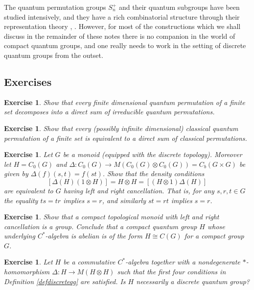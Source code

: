 \documentclass[a4paper]{amsart}
\numberwithin{equation}{section}
\theoremstyle{change}
\newtheorem{exercise}[theorem]{Exercise}
\begin{document}
The quantum permutation groups $ S_n^+ $ and their quantum subgroups have been studied intensively, and they have a rich combinatorial structure through their representation theory \cite{BANICA_quantumpermutationgroups}, \cite{FRESLON_compactquantumgroupscombinatorics}. 
However, for most of the constructions which we shall 
discuss in the remainder of these notes there is no companion in the world of compact quantum groups, and one really needs to work in the setting of discrete quantum groups from the outset. 

\subsection{Exercises}

\begin{exercise} \label{ex21}
Show that every finite dimensional quantum permutation of a finite set decomposes into a direct sum of irreducible quantum permutations. 
\end{exercise}

\begin{exercise} \label{ex22}
Show that every (possibly infinite dimensional) classical quantum permutation of a finite set is equivalent to a direct sum of classical permutations. 
\end{exercise}

\begin{exercise}
Let $ G $ be a monoid (equipped with the discrete topology). Moreover let $ H = C_0(G) $ and $ \Delta: C_0(G) \rightarrow M(C_0(G) \otimes C_0(G)) = C_b(G \times G) $ be given by $ \Delta(f)(s,t) = f(st) $. Show that the density conditions 
$$ 
[\Delta(H)(1 \otimes H)] = H \otimes H = [(H \otimes 1)\Delta(H)] $$
are equivalent to $ G $ having left and right cancellation. That is, for any $ s,r,t \in G $ the equality $ ts = tr $ implies $ s = r $, and similarly $ st = rt $ implies $ s = r $. 
\end{exercise}

\begin{exercise}
Show that a compact topological monoid with left and right cancellation is a group. Conclude that a compact quantum group $ H $ whose underlying $ C^* $-algebra is abelian is of the form $ H \cong C(G) $ for a compact group $ G $. 
\end{exercise}

\begin{exercise}
Let $ H $ be a commutative $ C^* $-algebra together with a nondegenerate $ * $-homomorphism $ \Delta: H \rightarrow M(H \otimes H) $ such that the first four conditions in Definition \ref{defdiscreteqg} are satisfied. Is $ H $ necessarily a discrete quantum group? 
\end{exercise}
\end{document}
